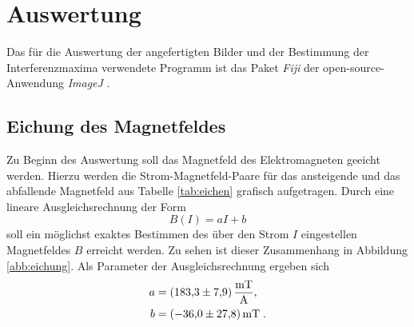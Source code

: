 \section{Auswertung}
Das für die Auswertung der angefertigten Bilder und der Bestimmung der Interferenzmaxima verwendete Programm ist das Paket \textit{Fiji} der open-source-Anwendung \textit{ImageJ} \cite{Fiji}.

\subsection{Eichung des Magnetfeldes}
Zu Beginn des Auswertung soll das Magnetfeld des Elektromagneten geeicht werden. Hierzu werden die Strom-Magnetfeld-Paare für das ansteigende und das abfallende Magnetfeld aus Tabelle \ref{tab:eichen} grafisch aufgetragen.
Durch eine lineare Ausgleichsrechnung der Form
\begin{equation}
  B(I)=aI+b
\end{equation}
soll ein möglichst exaktes Bestimmen des über den Strom $I$ eingestellen Magnetfeldes $B$ erreicht werden.
Zu sehen ist dieser Zusammenhang in Abbildung \ref{abb:eichung}.
Als Parameter der Ausgleichsrechnung ergeben sich
\begin{align*}
  a &= \SI{183,3 \pm 7,9}{\milli\tesla\per\ampere},\\
    b &= \SI{-36,0 \pm 27,8}{\milli\tesla}\;.
\end{align*}

